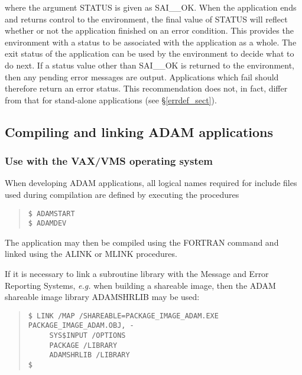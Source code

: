 where the argument STATUS is given as SAI\_\_OK. 
When the application ends and returns control to the environment, the final
value of STATUS will reflect whether or not the application finished on an
error condition.
This provides the environment with a status to be associated with the
application as a whole. 
The exit status of the application can be used by the environment to decide
what to do next. 
If a status value other than SAI\_\_OK is returned to the environment,
then any pending error messages are output. 
Applications which fail should therefore return an error status.
This recommendation does not, in fact, differ from that for stand-alone 
applications (see \S\ref{errdef_sect}).


\subsection {Compiling and linking ADAM applications} \label{adam_link}

\subsubsection {Use with the VAX/VMS operating system}

When developing ADAM applications, all logical names required for include
files used during compilation are defined by executing the procedures

\begin {quote}
\begin {small}
\begin{verbatim}
$ ADAMSTART
$ ADAMDEV
\end{verbatim}
\end {small}
\end {quote}

The application may then be compiled using the FORTRAN command and linked using
the ALINK or MLINK procedures. 

If it is necessary to link a subroutine library with the Message and Error
Reporting Systems, {\em e.g.} when building a shareable image, then the
ADAM shareable image library ADAMSHRLIB may be used:

\begin {quote}
\begin {small}
\begin{verbatim}
$ LINK /MAP /SHAREABLE=PACKAGE_IMAGE_ADAM.EXE PACKAGE_IMAGE_ADAM.OBJ, -
     SYS$INPUT /OPTIONS
     PACKAGE /LIBRARY
     ADAMSHRLIB /LIBRARY
$
\end{verbatim}
\end {small}
\end {quote}



